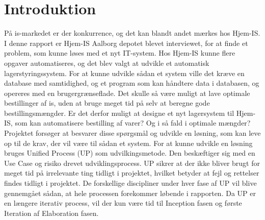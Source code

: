 \chapter{Introduktion}\label{ch:introduction}
På is-markedet er der konkurrence, og det kan blandt andet mærkes hos Hjem-IS. I denne rapport er Hjem-IS Aalborg depotet blevet interviewet, for at finde et problem, som kunne løses med et nyt IT-system.  
Hos Hjem-IS kunne flere opgaver automatiseres, og det blev valgt at udvikle et automatisk lagerstyringssystem. For at kunne udvikle sådan et system ville det kræve en database med samtidighed, og et program som kan håndtere data i databasen, og opereres med en brugergrænseflade. 
Det skulle så være muligt at lave optimale bestillinger af is, uden at bruge meget tid på selv at beregne gode bestillingsmængder. Er det derfor muligt at designe et nyt lagersystem til Hjem-IS, som kan automatisere bestilling af varer? Og i så fald i optimale mængder? 
Projektet forsøger at besvarer disse spørgsmål og udvikle en løsning, som kan leve op til de krav, der vil være til sådan et system. For at kunne udvikle en løsning bruges Unified Process (UP)\cite{UnifiedProcess} som udvilkingsmetode. Den beskæftiger sig med en Use Case og risiko drevet udviklingsprocess. UP sikrer at der ikke bliver brugt for meget tid på irrelevante ting tidligt i projektet, hvilket betyder at fejl og rettelser findes tidligt i projektet. De forskellige discipliner under hver fase af UP vil blive gennemgået sådan, at hele processen forekommer løbende i rapporten. Da UP er en længere iterativ process, vil der kun være tid til Inception fasen og første Iteration af Elaboration fasen\cite{UnifiedProcess}.
